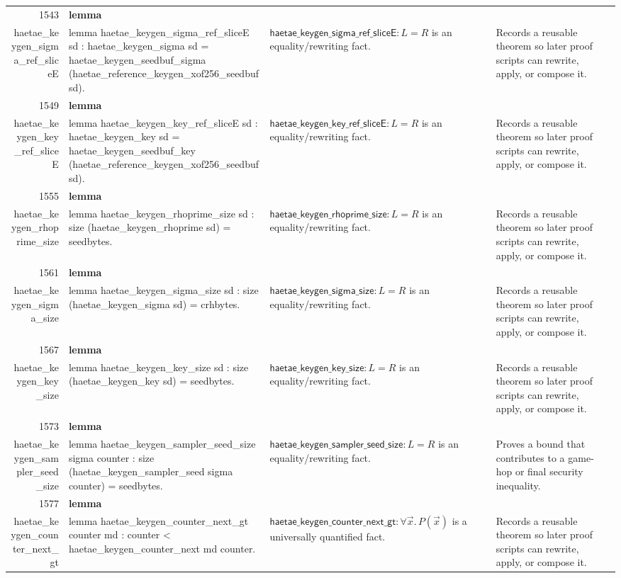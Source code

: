 \documentclass[10pt]{article}
\newcommand{\ec}[1]{\begingroup\ttfamily\scriptsize #1\endgroup}
\begin{document}
\begin{longtable}{r L{0.17\textwidth} L{0.26\textwidth} L{0.27\textwidth} L{0.20\textwidth}}
1543 & \textbf{lemma}\\\ec{haetae\_keygen\_sigma\_ref\_sliceE} & \ec{lemma haetae\_keygen\_sigma\_ref\_sliceE sd : haetae\_keygen\_sigma sd = haetae\_keygen\_seedbuf\_sigma (haetae\_reference\_keygen\_xof256\_seedbuf sd).} & \(\mathsf{haetae\_keygen\_sigma\_ref\_sliceE} : L = R\) is an equality/rewriting fact. & Records a reusable theorem so later proof scripts can rewrite, apply, or compose it. \\
1549 & \textbf{lemma}\\\ec{haetae\_keygen\_key\_ref\_sliceE} & \ec{lemma haetae\_keygen\_key\_ref\_sliceE sd : haetae\_keygen\_key sd = haetae\_keygen\_seedbuf\_key (haetae\_reference\_keygen\_xof256\_seedbuf sd).} & \(\mathsf{haetae\_keygen\_key\_ref\_sliceE} : L = R\) is an equality/rewriting fact. & Records a reusable theorem so later proof scripts can rewrite, apply, or compose it. \\
1555 & \textbf{lemma}\\\ec{haetae\_keygen\_rhoprime\_size} & \ec{lemma haetae\_keygen\_rhoprime\_size sd : size (haetae\_keygen\_rhoprime sd) = seedbytes.} & \(\mathsf{haetae\_keygen\_rhoprime\_size} : L = R\) is an equality/rewriting fact. & Records a reusable theorem so later proof scripts can rewrite, apply, or compose it. \\
1561 & \textbf{lemma}\\\ec{haetae\_keygen\_sigma\_size} & \ec{lemma haetae\_keygen\_sigma\_size sd : size (haetae\_keygen\_sigma sd) = crhbytes.} & \(\mathsf{haetae\_keygen\_sigma\_size} : L = R\) is an equality/rewriting fact. & Records a reusable theorem so later proof scripts can rewrite, apply, or compose it. \\
1567 & \textbf{lemma}\\\ec{haetae\_keygen\_key\_size} & \ec{lemma haetae\_keygen\_key\_size sd : size (haetae\_keygen\_key sd) = seedbytes.} & \(\mathsf{haetae\_keygen\_key\_size} : L = R\) is an equality/rewriting fact. & Records a reusable theorem so later proof scripts can rewrite, apply, or compose it. \\
1573 & \textbf{lemma}\\\ec{haetae\_keygen\_sampler\_seed\_size} & \ec{lemma haetae\_keygen\_sampler\_seed\_size sigma counter : size (haetae\_keygen\_sampler\_seed sigma counter) = seedbytes.} & \(\mathsf{haetae\_keygen\_sampler\_seed\_size} : L = R\) is an equality/rewriting fact. & Proves a bound that contributes to a game-hop or final security inequality. \\
1577 & \textbf{lemma}\\\ec{haetae\_keygen\_counter\_next\_gt} & \ec{lemma haetae\_keygen\_counter\_next\_gt counter md : counter < haetae\_keygen\_counter\_next md counter.} & \(\mathsf{haetae\_keygen\_counter\_next\_gt} : \forall \vec{x}.\, P(\vec{x})\) is a universally quantified fact. & Records a reusable theorem so later proof scripts can rewrite, apply, or compose it. \\

\end{longtable}
\end{document}
